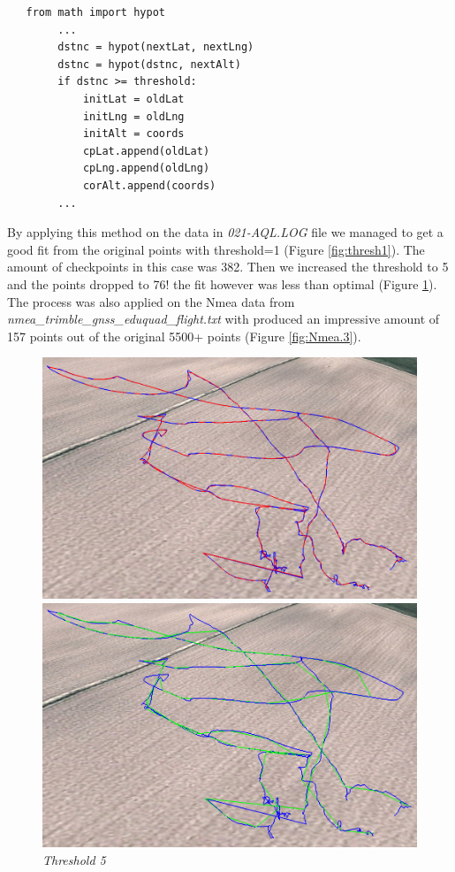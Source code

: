 \documentclass[paper=letter, fontsize=10pt]{article}
\begin{document}
\begin{verbatim}
   from math import hypot
        ...
        dstnc = hypot(nextLat, nextLng)
        dstnc = hypot(dstnc, nextAlt)
        if dstnc >= threshold:
            initLat = oldLat
            initLng = oldLng
            initAlt = coords
            cpLat.append(oldLat)
            cpLng.append(oldLng)
            corAlt.append(coords)
        ...
\end{verbatim}
By applying this method on the data in \textit{021-AQL.LOG} file we managed to get a good fit from the original points with threshold=1 (Figure \ref{fig:thresh1}). The amount of checkpoints in this case was 382. Then we increased the threshold to 5 and the points dropped to 76! the fit however was less than optimal (Figure \ref{fig:thresh5}). The process was also applied on the Nmea data from \textit{nmea\_trimble\_gnss\_eduquad\_flight.txt} with produced an impressive amount of 157 points out of the original 5500+ points (Figure \ref{fig:Nmea.3}).


\begin{figure}
\centering
\begin{minipage}{.5\textwidth}
	\centering
	\includegraphics[width=.8\linewidth]{Figures/Paths_threshold_1_w_alt}
	\caption{\textit{Threshold 1}}
	\label{fig:thresh1}
\end{minipage}%
\begin{minipage}{.5\textwidth}
	\centering
	\includegraphics[width=.8\linewidth]{Figures/Paths_threshold_5_w_alt}
	\caption{\textit{Threshold 5}}
	\label{fig:thresh5}
\end{minipage}
\end{figure}
\end{document}
